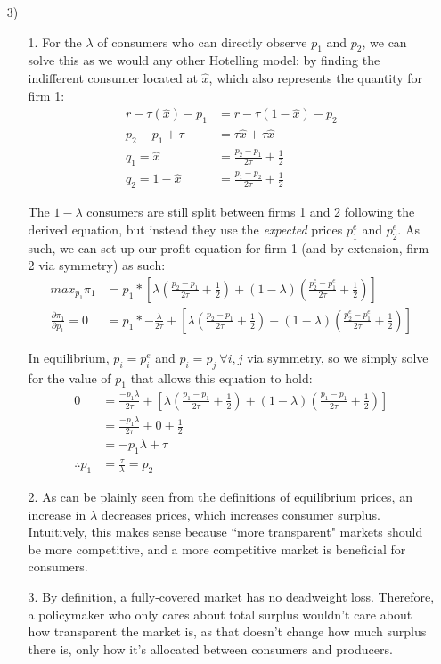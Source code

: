\documentclass[12pt,letterpaper]{article}
\begin{document}
\begin{enumerate}
\item[3)]
\begin{enumerate}
	\item[1.]
	For the $\lambda$ of consumers who can directly observe $p_1$ and $p_2$, we can solve this as we would any other Hotelling model: by finding the indifferent consumer located at $\hat{x}$, which also represents the quantity for firm 1:
	\begin{align*}
		r - \tau(\hat{x}) - p_1 &= r - \tau(1-\hat{x}) - p_2 \\
		p_2 - p_1 + \tau &= \tau \hat{x} + \tau \hat{x} \\
		q_1 = \hat{x} &= \frac{p_2 - p_1}{2\tau} + \frac{1}{2} \\
		q_2 = 1 - \hat{x} &= \frac{p_1 - p_2}{2\tau} + \frac{1}{2}
	\end{align*}

	The $1-\lambda$ consumers are still split between firms 1 and 2 following the derived equation, but instead they use the \textit{expected} prices $p_1^e$ and $p_2^e$. As such, we can set up our profit equation for firm 1 (and by extension, firm 2 via symmetry) as such:
	\begin{align*}
		max_{p_1} \pi_1 &= p_1 * [\lambda(\frac{p_2-p_1}{2\tau} + \frac{1}{2}) + (1-\lambda)(\frac{p_2^e - p_1^e}{2\tau} + \frac{1}{2})] \\
		\frac{\partial \pi_1}{\partial p_1} = 0 &= p_1 * - \frac{\lambda}{2\tau} + [\lambda(\frac{p_2-p_1}{2\tau} + \frac{1}{2}) + (1-\lambda)(\frac{p_2^e - p_1^e}{2\tau} + \frac{1}{2})]
	\end{align*}

	In equilibrium, $p_i = p_i^e$ and $p_i = p_j \ \forall i,j$ via symmetry, so we simply solve for the value of $p_1$ that allows this equation to hold:
	\begin{align*}
		0 &= \frac{-p_1\lambda}{2\tau} + [\lambda(\frac{p_1-p_1}{2\tau} + \frac{1}{2}) + (1-\lambda)(\frac{p_1 - p_1}{2\tau} + \frac{1}{2})]\\
		&= \frac{-p_1\lambda}{2\tau} + 0 + \frac{1}{2} \\
		&= -p_1\lambda + \tau \\
		\therefore p_1 &= \frac{\tau}{\lambda} = p_2
	\end{align*}
	\item[2.]
	As can be plainly seen from the definitions of equilibrium prices, an increase in $\lambda$ decreases prices, which increases consumer surplus. Intuitively, this makes sense because ``more transparent" markets should be more competitive, and a more competitive market is beneficial for consumers.
	\item[3.]
	By definition, a fully-covered market has no deadweight loss. Therefore, a policymaker who only cares about total surplus wouldn't care about how transparent the market is, as that doesn't change how much surplus there is, only how it's allocated between consumers and producers.
	

\end{enumerate}
\end{enumerate}
\end{document}
